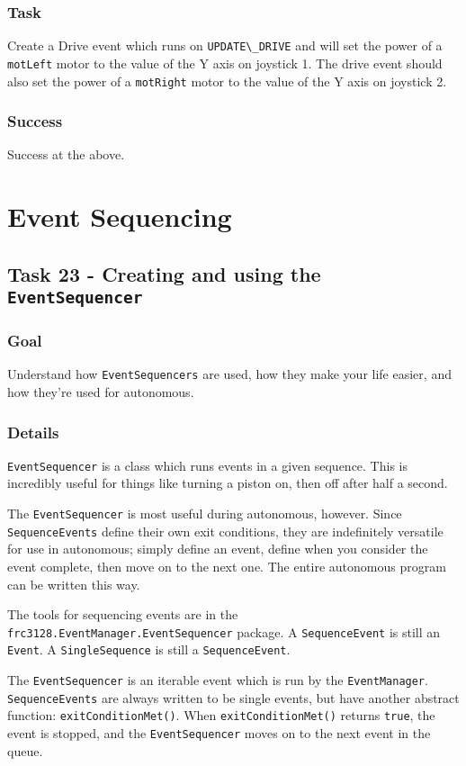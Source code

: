 \documentclass[a4paper]{article}
\begin{document}
\subsubsection{Task} Create a Drive event which runs on \lstinline{UPDATE\_DRIVE} and will set the power of a \lstinline{motLeft} motor to the value of the Y axis on joystick 1. The drive event should also set the power of a \lstinline{motRight} motor to the value of the Y axis on joystick 2.
\subsubsection{Success} Success at the above.


\section{Event Sequencing}

\subsection{Task 23 - Creating and using the \lstinline{EventSequencer}}
\subsubsection{Goal} Understand how \lstinline{EventSequencers} are used, how they make your life easier, and how they're used for autonomous.
\subsubsection{Details} \lstinline{EventSequencer} is a class which runs events in a given sequence. This is incredibly useful for things like turning a piston on, then off after half a second.

The \lstinline{EventSequencer} is most useful during autonomous, however. Since \lstinline{SequenceEvents} define their own exit conditions, they are indefinitely versatile for use in autonomous; simply define an event, define when you consider the event complete, then move on to the next one. The entire autonomous program can be written this way. 

The tools for sequencing events are in the \lstinline{frc3128.EventManager.EventSequencer} package. A \lstinline{SequenceEvent} is still an \lstinline{Event}. A \lstinline{SingleSequence} is still a \lstinline{SequenceEvent}.

The \lstinline{EventSequencer} is an iterable event which is run by the \lstinline{EventManager}. \lstinline{SequenceEvents} are always written to be single events, but have another abstract function: \lstinline{exitConditionMet()}. When \lstinline{exitConditionMet()} returns \lstinline{true}, the event is stopped, and the \lstinline{EventSequencer} moves on to the next event in the queue.
\end{document}
